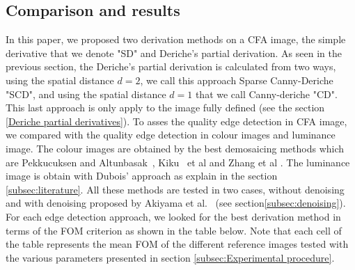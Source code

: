 \documentclass[twoside]{article}
\begin{document}
\subsection{Comparison and results}
\label{subsec:Comparison and results}

In this paper, we proposed two derivation methods on a CFA image, the simple derivative that we denote "SD" and Deriche's partial derivation. As seen in the previous section, the Deriche's partial derivation is calculated from two ways, using the spatial distance $d=2$, we call this approach Sparse Canny-Deriche "SCD", and using the spatial distance $d=1$ that we call Canny-deriche "CD". This last approach is only apply to the image fully defined (see the section \ref{Deriche partial derivatives}).  
To asses the quality edge detection in CFA image, we compared with the quality edge detection in colour images and luminance image. The colour images are obtained by the best demosaicing methods which are Pekkucuksen and Altunbasak~\cite{pekkucuksen_ip_2013}, Kiku~\cite{kiku_icip_2013} et al and Zhang et al \cite{zhang_ip_2005}. The luminance image is obtain with Dubois' approach \cite{dubois_spl_2005} as explain in the section \ref{subsec:literature}. All these methods are tested in two cases, without denoising and with denoising proposed by Akiyama et al.~\cite{akiyama_icip_2015} (see section\ref{subsec:denoising}).
For each edge detection approach, we looked for the best derivation method in terms of the FOM criterion as shown in the table below. Note that each cell of the table represents the mean FOM of the different reference images tested with the various parameters presented in section \ref{subsec:Experimental procedure}.
%
%	
\end{document}
